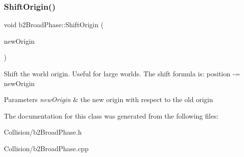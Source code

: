 \subsubsection{\texorpdfstring{Shift\+Origin()}{ShiftOrigin()}}
{\footnotesize\ttfamily void b2\+Broad\+Phase\+::\+Shift\+Origin (\begin{DoxyParamCaption}\item[{const \mbox{\hyperlink{structb2Vec2}{b2\+Vec2}} \&}]{new\+Origin }\end{DoxyParamCaption})\hspace{0.3cm}{\ttfamily [inline]}}

Shift the world origin. Useful for large worlds. The shift formula is\+: position -\/= new\+Origin 
\begin{DoxyParams}{Parameters}
{\em new\+Origin} & the new origin with respect to the old origin \\
\hline
\end{DoxyParams}


The documentation for this class was generated from the following files\+:\begin{DoxyCompactItemize}
\item 
Collision/b2\+Broad\+Phase.\+h\item 
Collision/b2\+Broad\+Phase.\+cpp\end{DoxyCompactItemize}
